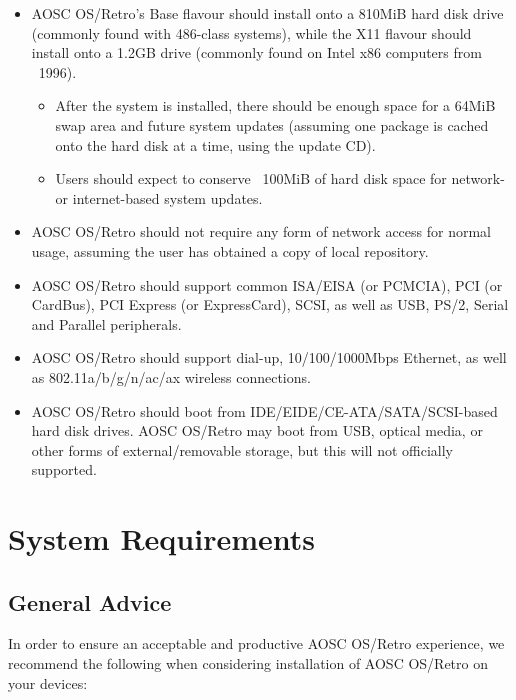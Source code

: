     \begin{itemize}
        \item AOSC OS/Retro's Base flavour should install onto a 810MiB hard disk drive (commonly found with 486-class systems), while the X11 flavour should install onto a 1.2GB drive (commonly found on Intel x86 computers from ~1996).
            \begin{itemize}
                \item After the system is installed, there should be enough space for a 64MiB swap area and future system updates (assuming one package is cached onto the hard disk at a time, using the update CD).
                \item Users should expect to conserve ~100MiB of hard disk space for network- or internet-based system updates.
            \end{itemize}
        \item AOSC OS/Retro should not require any form of network access for normal usage, assuming the user has obtained a copy of local repository.
        \item AOSC OS/Retro should support common ISA/EISA (or PCMCIA), PCI (or CardBus), PCI Express (or ExpressCard), SCSI, as well as USB, PS/2, Serial and Parallel peripherals.
        \item AOSC OS/Retro should support dial-up, 10/100/1000Mbps Ethernet, as well as 802.11a/b/g/n/ac/ax wireless connections.
        \item AOSC OS/Retro should boot from IDE/EIDE/CE-ATA/SATA/SCSI-based hard disk drives. AOSC OS/Retro may boot from USB, optical media, or other forms of external/removable storage, but this will not officially supported.
    \end{itemize}







    \chapter{System Requirements}

    \section{General Advice}

    In order to ensure an acceptable and productive AOSC OS/Retro experience, we recommend the following when considering installation of AOSC OS/Retro on your devices:


